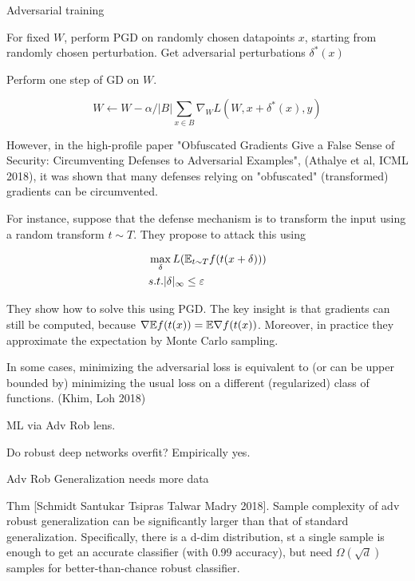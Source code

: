 \documentclass[english]{article}
\begin{document}
\item Adversarial training

\benum
\item For fixed $W$, perform PGD on randomly chosen datapoints $x$, starting from randomly chosen perturbation. Get adversarial perturbations $\delta^*(x)$
\item Perform one step of GD on $W$. 

$$W\gets 
W-\alpha/|B|\sum_{x\in B}\nabla_W L(W,x+\delta^*(x),y)
$$
\eenum 

\eenum

\item 
However, in the high-profile paper "Obfuscated Gradients Give a False Sense of Security: Circumventing Defenses to Adversarial Examples", (Athalye et al, ICML 2018), it was shown that many defenses relying on "obfuscated" (transformed) gradients can be circumvented. 

For instance, suppose that the defense mechanism is to transform the input using a random transform $t\sim T$. They propose to attack this using 

\begin{align*}
&\max_\delta L(\mathbb{E}_{t\sim T} f(t(x+\delta)))\\
&s.t. |\delta|_\infty \le \varepsilon
\end{align*}

They show how to solve this using PGD. The key insight is that gradients can still be computed, because $\nabla \mathbb{E} f(t(x)) = \mathbb{E} \nabla f(t(x)) $. Moreover, in practice they approximate the expectation by Monte Carlo sampling.

\item In some cases, minimizing the adversarial loss is equivalent to (or can be upper bounded by) minimizing the usual loss on a different (regularized) class of functions. (Khim, Loh 2018)

\item ML via Adv Rob lens. 

\benum 
\item Do robust deep networks overfit? Empirically yes. 

Adv Rob Generalization needs more data

Thm [Schmidt Santukar Tsipras Talwar Madry 2018]. Sample complexity of adv robust generalization can be significantly larger than that of standard generalization. Specifically, there is a d-dim distribution, st a single sample is enough to get an accurate classifier (with 0.99 accuracy), but need $\Omega(\sqrt{d})$ samples for better-than-chance robust classifier.
\end{document}
